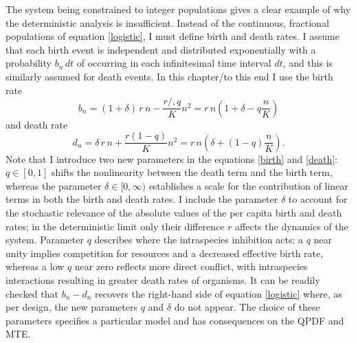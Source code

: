 The system being constrained to integer populations gives a clear example of why the deterministic analysis is insufficient. 
Instead of the continuous, fractional populations of equation \ref{logistic}, I must define birth and death rates. 
I assume that each birth event is independent and distributed exponentially with a probability $b_n\,dt$ of occurring in each infinitesimal time interval $dt$, and this is similarly assumed for death events. %
In this chapter/to this end I use the birth rate
\begin{equation}
b_n = (1 + \delta)\,r\,n - \frac{r/,q}{K}n^2 = r\,n\left(1+\delta-q\frac{n}{K}\right)
\label{birth}
\end{equation}
and death rate
\begin{equation}
d_n = \delta\,r\,n + \frac{r(1-q)}{K} n^2 = r\,n\left(\delta+(1-q)\frac{n}{K}\right).
\label{death}
\end{equation}
Note that I introduce two new parameters in the equations \ref{birth} and \ref{death}: $q\in[0,1]$ shifts the nonlinearity between the death term and the birth term, whereas the parameter $\delta\in[0,\infty)$ establishes a scale for the contribution of linear terms in both the birth and death rates. 
I include the parameter $\delta$ to account for the stochastic relevance of the absolute values of the per capita birth and death rates; in the deterministic limit only their difference $r$ affects the dynamics of the system. 
Parameter $q$ describes where the intraspecies inhibition acts: a $q$ near unity implies competition for resources and a decreased effective birth rate, whereas a low $q$ near zero reflects more direct conflict, with intraspecies interactions resulting in greater death rates of organisms. 
It can be readily checked that $b_n-d_n$ recovers the right-hand side of equation \ref{logistic} where, as per design, the new parameters $q$ and $\delta$ do not appear.
The choice of these parameters specifies a particular model and has consequences on the QPDF and MTE. 

